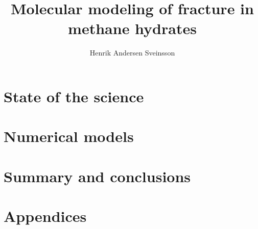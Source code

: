 \documentclass[twoside, english, a4paper, 11pt]{../../uiofysmaster/uiofysmaster}
\title{Molecular modeling of fracture in methane hydrates}
\author{Henrik Andersen Sveinsson}
\begin{document}
\maketitle




\tableofcontents

\listoffigures
\listoftables



\part{State of the science}




\part{Numerical models}





\part{Summary and conclusions}


\part{Appendices}
\appendix
%





\end{document}
